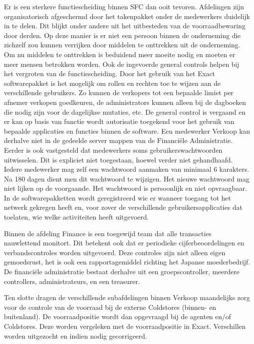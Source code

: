 Er is een sterkere functiescheiding binnen SFC dan ooit tevoren. Afdelingen zijn organisatorisch afgeschermd door het takenpakket onder de medewerkers duidelijk in te delen. Dit blijkt onder andere uit het uitbesteden van de voorraadbewaring door derden. Op deze manier is er niet een persoon binnen de onderneming die zichzelf zou kunnen verrijken door middelen te onttrekken uit de onderneming. Om nu middelen te onttrekken is beduidend meer moeite nodig en moeten er meer mensen betrokken worden. Ook de ingevoerde general controls helpen bij het vergroten van de functiescheiding. Door het gebruik van het Exact softwarepakket is het mogelijk om rollen en rechten toe te wijzen aan de verschillende gebruikers. Zo kunnen de verkopers tot een bepaalde limiet per afnemer verkopen goedkeuren, de administrators kunnen alleen bij de dagboeken die nodig zijn voor de dagelijkse mutaties, etc. De general control is vergaand en er kan op basis van functie wordt autorisatie toegekend voor het gebruik van bepaalde applicaties en functies binnen de software. Een medewerker Verkoop kan derhalve niet in de gedeelde server mappen van de Financiële Administratie. Eerder is ook vastgesteld dat medewerkers soms gebruikerswachtwoorden uitwisselen. Dit is expliciet niet toegestaan, hoewel verder niet gehandhaafd. Iedere medewerker mag zelf een wachtwoord aanmaken van minimaal 6 karakters. Na 180 dagen dient men dit wachtwoord te wijzigen. Het nieuwe wachtwoord mag niet lijken op de voorgaande. Het wachtwoord is persoonlijk en niet opvraagbaar. In de softwarepakketten wordt geregistreerd wie er wanneer toegang tot het netwerk gekregen heeft en, voor zover de verschillende gebruikersapplicaties dat toelaten, wie welke activiteiten heeft uitgevoerd. \citep{aoibsfc}

Binnen de afdeling Finance is een toegewijd team dat alle transacties nauwlettend monitort. Dit betekent ook dat er periodieke cijferbeoordelingen en verbandscontroles worden uitgevoerd. Deze controles zijn niet alleen eigen gemoedsrust, het is ook een rapportagemiddel richting het Japanse moederbedrijf. De financiële administratie bestaat derhalve uit een groepscontroller, meerdere controllers, administrateurs, en een treasurer. \citep{aoibsfc} 

Ten slotte dragen de verschillende subafdelingen binnen Verkoop maandelijks zorg voor de controle van de voorraad bij de externe Coldstores (binnen- en buitenland). De voorraadpositie wordt dan opgevraagd bij de agenten en/of Coldstores. Deze worden vergeleken met de voorraadpositie in Exact. Verschillen worden uitgezocht en indien nodig gecorrigeerd. \citep{aoibsfc} 

